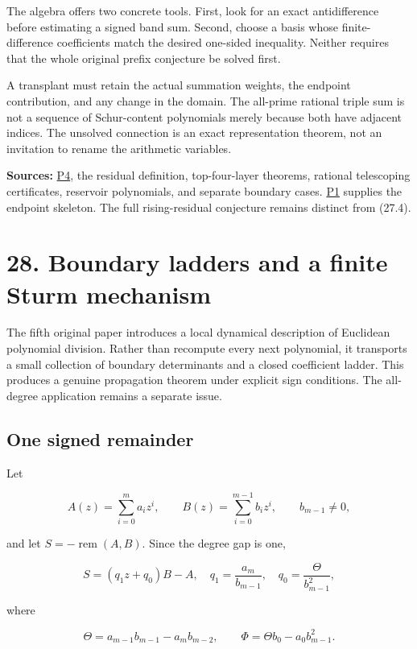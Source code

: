 \documentclass[
  10pt,
  a4paper,
  10pt,
  oneside,
  openany]{book}
\begin{document}
The algebra offers two concrete tools. First, look for an exact
antidifference before estimating a signed band sum. Second, choose a
basis whose finite-difference coefficients match the desired one-sided
inequality. Neither requires that the whole original prefix conjecture
be solved first.

A transplant must retain the actual summation weights, the endpoint
contribution, and any change in the domain. The all-prime rational
triple sum is not a sequence of Schur-content polynomials merely because
both have adjacent indices. The unsolved connection is an exact
representation theorem, not an invitation to rename the arithmetic
variables.

\textbf{Sources:} \hyperref[source-p4]{P4}, the residual definition,
top-four-layer theorems, rational telescoping certificates, reservoir
polynomials, and separate boundary cases. \hyperref[source-p1]{P1}
supplies the endpoint skeleton. The full rising-residual conjecture
remains distinct from (27.4).

\section{28. Boundary ladders and a finite Sturm
mechanism}\label{ch-ladder}

The fifth original paper introduces a local dynamical description of
Euclidean polynomial division. Rather than recompute every next
polynomial, it transports a small collection of boundary determinants
and a closed coefficient ladder. This produces a genuine propagation
theorem under explicit sign conditions. The all-degree application
remains a separate issue.

\subsection{One signed remainder}\label{one-signed-remainder}

Let

\[
 A(z)=\sum_{i=0}^ma_iz^i,\qquad
 B(z)=\sum_{i=0}^{m-1}b_iz^i,\qquad b_{m-1}\ne0,
\]

and let \(S=-\operatorname{rem}(A,B)\). Since the degree gap is one,

\[
 S=(q_1z+q_0)B-A,
 \quad q_1=\frac{a_m}{b_{m-1}},
 \quad q_0=\frac{\Theta}{b_{m-1}^2},
\]

where

\[
 \Theta=a_{m-1}b_{m-1}-a_mb_{m-2},\qquad
 \Phi=\Theta b_0-a_0b_{m-1}^2.
 \tag{28.1}\label{eq:28.1}
\]
\end{document}
